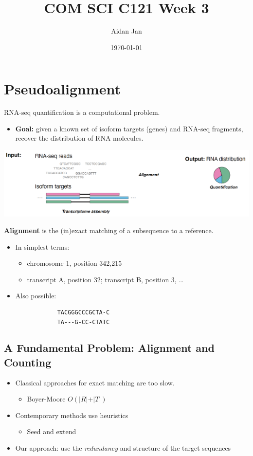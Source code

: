 \documentclass[10pt]{article}
\title{COM SCI C121 Week 3}
\author{Aidan Jan}
\date{\today}
\begin{document}
\maketitle

\section*{Pseudoalignment}
RNA-seq quantification is a computational problem.
\begin{itemize}
    \item \textbf{Goal:} given a known set of isoform targets (genes) and RNA-seq fragments, recover the distribution of RNA molecules.
\end{itemize}
\begin{center}
    \includegraphics*[scale=0.5]{W4_1.png}
\end{center}
\textbf{Alignment} is the (in)exact matching of a subsequence to a reference.
\begin{itemize}
    \item In simplest terms:
    \begin{itemize}
        \item chromosome 1, position 342,215
        \item transcript A, position 32; transcript B, position 3, \dots
    \end{itemize}
    \item Also possible:
    \begin{verbatim}
            TACGGGCCCGCTA-C
            TA---G-CC-CTATC
    \end{verbatim}
\end{itemize}

\subsection*{A Fundamental Problem: Alignment and Counting}
\begin{itemize}
    \item Classical approaches for exact matching are too slow.
    \begin{itemize}
        \item Boyer-Moore $O(\vert R \vert + \vert T \vert)$\
    \end{itemize}
    \item Contemporary methods use heuristics
    \begin{itemize}
        \item Seed and extend
    \end{itemize}
    \item Our approach: use the \textit{redundancy} and structure of the target sequences
\end{itemize}
\end{document}
